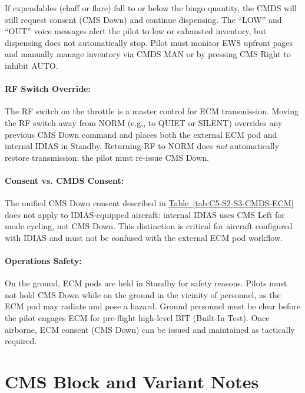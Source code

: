 \documentclass[11pt, a4paper, twoside]{report}
\newcommand{\tabref}[1]{\hyperref[#1]{Table~\ref*{#1}}}
\begin{document}
If expendables (chaff or flare) fall to or below the bingo quantity, the CMDS will still request consent (CMS Down) and continue dispensing. The ``LOW'' and ``OUT'' voice messages alert the pilot to low or exhausted inventory, but dispensing does not automatically stop. Pilot must monitor EWS upfront pages and manually manage inventory via CMDS MAN or by pressing CMS Right to inhibit AUTO.

\paragraph{RF Switch Override:}

The RF switch on the throttle is a master control for ECM transmission. Moving the RF switch away from NORM (e.g., to QUIET or SILENT) overrides any previous CMS Down command and places both the external ECM pod and internal IDIAS in Standby. Returning RF to NORM does \textit{not} automatically restore transmission; the pilot must re-issue CMS Down.

\paragraph{Consent vs. CMDS Consent:}

The unified CMS Down consent described in \tabref{tab:C5-S2-S3-CMDS-ECM} does not apply to IDIAS-equipped aircraft: internal IDIAS uses CMS Left for mode cycling, not CMS Down. This distinction is critical for aircraft configured with IDIAS and must not be confused with the external ECM pod workflow.

\paragraph{Operations Safety:}

On the ground, ECM pods are held in Standby for safety reasons. Pilots must not hold CMS Down while on the ground in the vicinity of personnel, as the ECM pod may radiate and pose a hazard. Ground personnel must be clear before the pilot engages ECM for pre-flight high-level BIT (Built-In Test). Once airborne, ECM consent (CMS Down) can be issued and maintained as tactically required.

\section{CMS Block and Variant Notes}
\label{sec:C5-S3}
\end{document}
